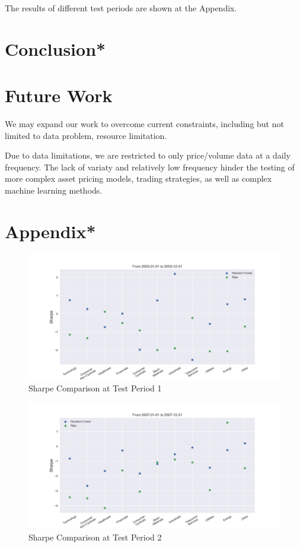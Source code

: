 \documentclass[12pt]{article}
\begin{document}
The results of different test periods are shown at the Appendix.

\section{Conclusion*}


\section{Future Work}

We may expand our work to overcome current constraints, including but not limited to data problem, resource limitation.

Due to data limitations, we are restricted to only price/volume data at a daily frequency. The lack of variaty and relatively low frequency hinder the testing of more complex asset pricing models, trading strategies, as well as complex machine learning methods.


\section{Appendix*}

\begin{figure}[!ht]
  \begin{center}
    \includegraphics[width=1\linewidth]{figure/rf_raw_Sharpe_time_0.png}
  \end{center}
  \caption{Sharpe Comparison at Test Period 1}
  \label{fig:rf_raw_Sharpe_time_1}
\end{figure}

\begin{figure}[!ht]
  \begin{center}
    \includegraphics[width=1\linewidth]{figure/rf_raw_Sharpe_time_1.png}
  \end{center}
  \caption{Sharpe Comparison at Test Period 2}
  \label{fig:rf_raw_Sharpe_time_2}
\end{figure}
\end{document}
